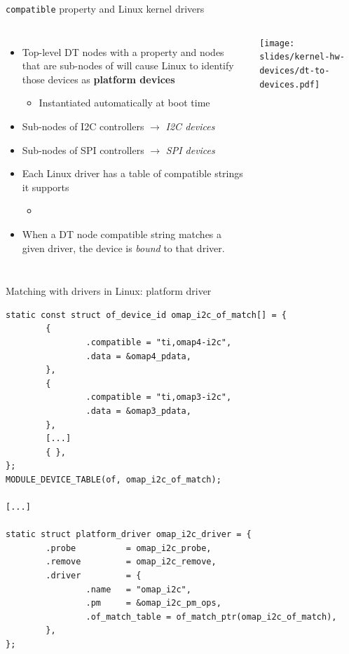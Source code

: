 \begin{frame}{{\tt compatible} property and Linux kernel drivers}
  \begin{columns}
    \begin{itemize}
    \item Top-level DT nodes with a  property and
      nodes that are sub-nodes of  will cause Linux
      to identify those devices as {\bf platform devices}
      \begin{itemize}
      \item Instantiated automatically at boot time
      \end{itemize}
    \item Sub-nodes of I2C controllers $\rightarrow$ {\em I2C devices}
    \item Sub-nodes of SPI controllers $\rightarrow$ {\em SPI devices}
    \item Each Linux driver has a table of compatible strings it supports
      \begin{itemize}
      \item {}\code{[]}
      \end{itemize}
    \item When a DT node compatible string matches a given driver, the
      device is {\em bound} to that driver.
    \end{itemize}
    \texttt{[image: slides/kernel-hw-devices/dt-to-devices.pdf]}
  \end{columns}
\end{frame}

\begin{frame}[fragile]{Matching with drivers in Linux: platform driver}
  \begin{block}{}
    {\tiny
\begin{verbatim}
static const struct of_device_id omap_i2c_of_match[] = {
        {
                .compatible = "ti,omap4-i2c",
                .data = &omap4_pdata,
        },
        {
                .compatible = "ti,omap3-i2c",
                .data = &omap3_pdata,
        },
        [...]
        { },
};
MODULE_DEVICE_TABLE(of, omap_i2c_of_match);

[...]

static struct platform_driver omap_i2c_driver = {
        .probe          = omap_i2c_probe,
        .remove         = omap_i2c_remove,
        .driver         = {
                .name   = "omap_i2c",
                .pm     = &omap_i2c_pm_ops,
                .of_match_table = of_match_ptr(omap_i2c_of_match),
        },
};
\end{verbatim}
    }
  \end{block}
\end{frame}

